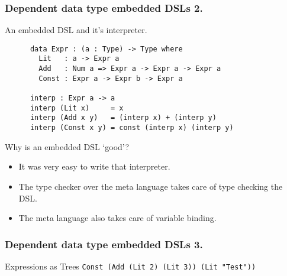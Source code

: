 \documentclass{beamer}
\begin{document}
\begin{frame}[fragile]
  \frametitle{Dependent data type embedded DSLs 2.}
  \begin{block}{An embedded DSL and it's interpreter.}
    \begin{verbatim}
      data Expr : (a : Type) -> Type where
        Lit   : a -> Expr a
        Add   : Num a => Expr a -> Expr a -> Expr a
        Const : Expr a -> Expr b -> Expr a

      interp : Expr a -> a
      interp (Lit x)     = x
      interp (Add x y)   = (interp x) + (interp y)
      interp (Const x y) = const (interp x) (interp y)
    \end{verbatim}
  \end{block}
  \begin{block}{Why is an embedded DSL `good'?}
    \begin{itemize}
      \item It was very easy to write that interpreter.
      \item The type checker over the meta language takes care of
        type checking the DSL.
      \item The meta language also takes care of variable binding.
    \end{itemize}
  \end{block}
\end{frame}

\begin{frame}[fragile]
  \frametitle{Dependent data type embedded DSLs 3.}
  \begin{block}{Expressions as Trees}
  \texttt{Const (Add (Lit 2) (Lit 3)) (Lit "Test"))}
  \begin{center}
  \end{center}
  \end{block}
\end{frame}
\end{document}
